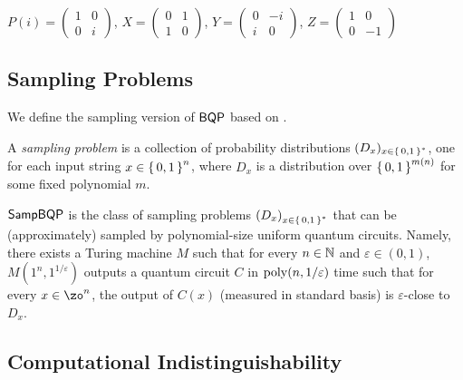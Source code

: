 \begin{definition}
	$P(i)=\begin{pmatrix}1&0\\0&i\end{pmatrix}$,
	$X=\begin{pmatrix}0&1\\1&0\end{pmatrix}$,
	$Y=\begin{pmatrix}0&-i\\i&0\end{pmatrix}$,
	$Z=\begin{pmatrix}1&0\\0&-1\end{pmatrix}$
\end{definition}

\subsection{Sampling Problems}

We define the sampling version of $\operatorname{\mathsf{BQP}}$ based on \cite{aaronson_2013}.

\begin{definition} 
	A \emph{sampling problem} is a collection of probability distributions $(D_x)_{x\in\set{0, 1}^*}$, one for each input string $x\in\set{0,1}^n$, where $D_x$ is a distribution over $\set{0,1}^{m(n)}$ for some fixed polynomial $m$.
\end{definition}

\begin{definition} [$\SampBQP$]
	$\SampBQP$ is the class of sampling problems $\left(D_x\right)_{x\in\set{0, 1}^*}$ that can be (approximately) sampled by polynomial-size uniform quantum circuits. Namely, there exists a Turing machine $M$ such that for every $n \in \mathbb{N}$ and $\varepsilon \in (0,1)$, $M(1^n, 1^{1/\varepsilon})$ outputs a quantum circuit $C$ in $\operatorname*{\operatorname{poly}}(n, 1/\varepsilon)$ time such that for every $x \in \zo^n$, the output of $C(x)$ (measured in standard basis) is $\varepsilon$-close to $D_x$.
\end{definition}


\subsection{Computational Indistinguishability}


